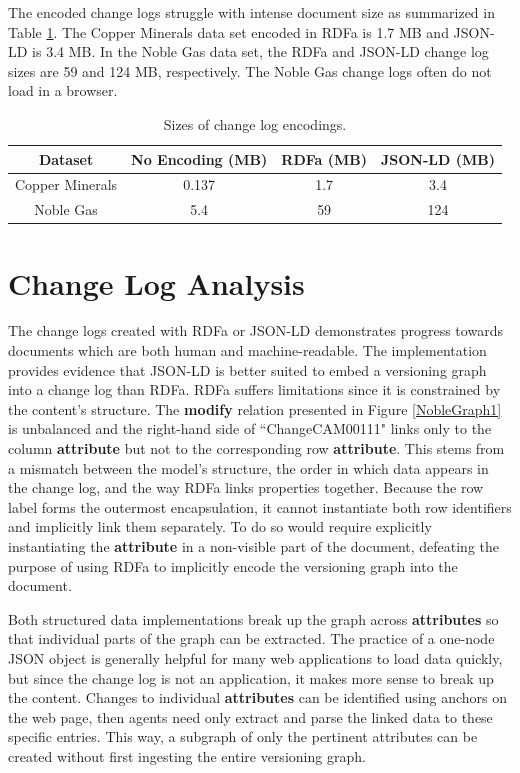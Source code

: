 The encoded change logs struggle with intense document size as summarized in Table \ref{changelog_table}.
The Copper Minerals data set encoded in RDFa is 1.7 MB and JSON-LD is 3.4 MB.
In the Noble Gas data set, the RDFa and JSON-LD change log sizes are 59 and 124 MB, respectively.
The Noble Gas change logs often do not load in a browser.

\begin{table}
	\caption{Sizes of change log encodings.}
	\label{changelog_table}
	\centering
	\begin{tabular}{|c|c|c|c|}
		\hline
		Dataset & No Encoding (MB) & RDFa (MB) & JSON-LD (MB) \\
		\hline
		Copper Minerals & 0.137 & 1.7 & 3.4 \\
		Noble Gas & 5.4 & 59 & 124 \\
		\hline
	\end{tabular}
\end{table}

\section{Change Log Analysis}

The change logs created with RDFa or JSON-LD demonstrates progress towards documents which are both human and machine-readable.
The implementation provides evidence that JSON-LD is better suited to embed a versioning graph into a change log than RDFa.
RDFa suffers limitations since it is constrained by the content's structure.
The \textbf{modify} relation presented in Figure \ref{NobleGraph1} is unbalanced and the right-hand side of ``ChangeCAM00111" links only to the column \textbf{attribute} but not to the corresponding row \textbf{attribute}.
This stems from a mismatch between the model's structure, the order in which data appears in the change log, and the way RDFa links properties together.
Because the row label forms the outermost encapsulation, it cannot instantiate both row identifiers and implicitly link them separately.
To do so would require explicitly instantiating the \textbf{attribute} in a non-visible part of the document, defeating the purpose of using RDFa to implicitly encode the versioning graph into the document.

Both structured data implementations break up the graph across \textbf{attributes} so that individual parts of the graph can be extracted.
The practice of a one-node JSON object is generally helpful for many web applications to load data quickly, but since the change log is not an application, it makes more sense to break up the content.
Changes to individual \textbf{attributes} can be identified using anchors on the web page, then agents need only extract and parse the linked data to these specific entries.
This way, a subgraph of only the pertinent attributes can be created without first ingesting the entire versioning graph.

